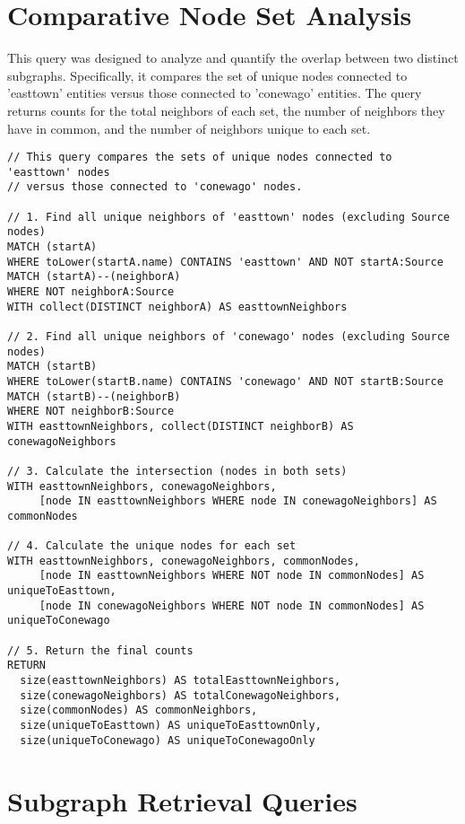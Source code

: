 \section{Comparative Node Set Analysis}

This query was designed to analyze and quantify the overlap between two distinct subgraphs. Specifically, it compares the set of unique nodes connected to 'easttown' entities versus those connected to 'conewago' entities. The query returns counts for the total neighbors of each set, the number of neighbors they have in common, and the number of neighbors unique to each set.

\begin{lstlisting}[style=cypher, caption={Comparison of node sets connected to 'easttown' and 'conewago'.}, label={lst:node_counts}]
// This query compares the sets of unique nodes connected to 'easttown' nodes
// versus those connected to 'conewago' nodes.

// 1. Find all unique neighbors of 'easttown' nodes (excluding Source nodes)
MATCH (startA)
WHERE toLower(startA.name) CONTAINS 'easttown' AND NOT startA:Source
MATCH (startA)--(neighborA)
WHERE NOT neighborA:Source
WITH collect(DISTINCT neighborA) AS easttownNeighbors

// 2. Find all unique neighbors of 'conewago' nodes (excluding Source nodes)
MATCH (startB)
WHERE toLower(startB.name) CONTAINS 'conewago' AND NOT startB:Source
MATCH (startB)--(neighborB)
WHERE NOT neighborB:Source
WITH easttownNeighbors, collect(DISTINCT neighborB) AS conewagoNeighbors

// 3. Calculate the intersection (nodes in both sets)
WITH easttownNeighbors, conewagoNeighbors,
     [node IN easttownNeighbors WHERE node IN conewagoNeighbors] AS commonNodes

// 4. Calculate the unique nodes for each set
WITH easttownNeighbors, conewagoNeighbors, commonNodes,
     [node IN easttownNeighbors WHERE NOT node IN commonNodes] AS uniqueToEasttown,
     [node IN conewagoNeighbors WHERE NOT node IN commonNodes] AS uniqueToConewago

// 5. Return the final counts
RETURN
  size(easttownNeighbors) AS totalEasttownNeighbors,
  size(conewagoNeighbors) AS totalConewagoNeighbors,
  size(commonNodes) AS commonNeighbors,
  size(uniqueToEasttown) AS uniqueToEasttownOnly,
  size(uniqueToConewago) AS uniqueToConewagoOnly
\end{lstlisting}

\section{Subgraph Retrieval Queries}

